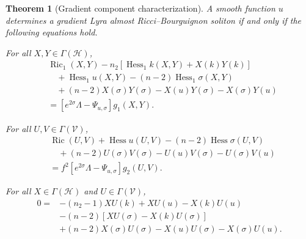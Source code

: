 \documentclass[a4paper,11pt]{article}
\theoremstyle{plain}
\newtheorem{theorem}{Theorem}[section]
\numberwithin{equation}{section}
\begin{document}
\begin{theorem}[Gradient component characterization]
	\label{thm:gradient-lyra-arbs-components}
	A smooth function \(u\) determines a gradient Lyra almost
	Ricci--Bourguignon soliton if and only if the following equations
	hold.
	
	For all \(X,Y\in\Gamma(\mathcal H)\),
	\begin{align}
		&\operatorname{Ric}_{1}(X,Y)
		-
		n_{2}
		\left[
		\operatorname{Hess}_{1}k(X,Y)
		+
		X(k)Y(k)
		\right]
		\nonumber\\
		&\quad
		+
		\operatorname{Hess}_{1}u(X,Y)
		-
		(n-2)\operatorname{Hess}_{1}\sigma(X,Y)
		\nonumber\\
		&\quad
		+
		(n-2)X(\sigma)Y(\sigma)
		-
		X(u)Y(\sigma)
		-
		X(\sigma)Y(u)
		\nonumber\\
		&=
		\left[
		e^{2\sigma}\Lambda
		-
		\Psi_{u,\sigma}
		\right]
		g_{1}(X,Y).
		\label{eq:gradient-lyra-arbs-horizontal}
	\end{align}
	
	For all \(U,V\in\Gamma(\mathcal V)\),
	\begin{align}
		&\operatorname{Ric}(U,V)
		+
		\operatorname{Hess}u(U,V)
		-
		(n-2)\operatorname{Hess}\sigma(U,V)
		\nonumber\\
		&\quad
		+
		(n-2)U(\sigma)V(\sigma)
		-
		U(u)V(\sigma)
		-
		U(\sigma)V(u)
		\nonumber\\
		&=
		f^{2}
		\left[
		e^{2\sigma}\Lambda
		-
		\Psi_{u,\sigma}
		\right]
		g_{2}(U,V).
		\label{eq:gradient-lyra-arbs-vertical}
	\end{align}
	
	For all
	\(X\in\Gamma(\mathcal H)\) and
	\(U\in\Gamma(\mathcal V)\),
	\begin{align}
		0
		={}&
		-
		(n_{2}-1)XU(k)
		+
		XU(u)
		-
		X(k)U(u)
		\nonumber\\
		&-
		(n-2)
		\left[
		XU(\sigma)
		-
		X(k)U(\sigma)
		\right]
		\nonumber\\
		&+
		(n-2)X(\sigma)U(\sigma)
		-
		X(u)U(\sigma)
		-
		X(\sigma)U(u).
		\label{eq:gradient-lyra-arbs-mixed}
	\end{align}
\end{theorem}
\end{document}
